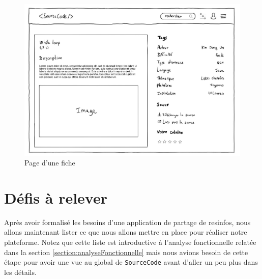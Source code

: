 \begin{figure}[H]
    \includegraphics[width=\textwidth,height=0.4\textheight,keepaspectratio]{images/resource.JPG}
    \centering
    \caption{Page d'une \gls{fiche}}
\end{figure}

\pagebreak
\section{Défis à relever}
\label{section:challengesToDefeat}

Après avoir formalisé les besoins d'une application de partage de \glspl{resinfo}, nous allons maintenant lister ce que nous allons mettre en place pour réaliser notre plateforme. Notez que cette liste est introductive à l'analyse fonctionnelle relatée dans la section \ref{section:analyseFonctionnelle} mais nous avions besoin de cette étape pour avoir une vue au global de \texttt{SourceCode} avant d'aller un peu plus dans les détails.

